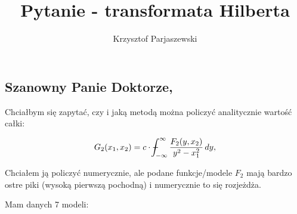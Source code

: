 \documentclass[12pt,twoside,a4paper]{article}
\title{Pytanie - transformata Hilberta}
\author{Krzysztof Parjaszewski}
\def\Xint#1{\mathchoice
{\XXint\displaystyle\textstyle{#1}}%
{\XXint\textstyle\scriptstyle{#1}}%
{\XXint\scriptstyle\scriptscriptstyle{#1}}%
{\XXint\scriptscriptstyle\scriptscriptstyle{#1}}%
\!\int}
\def\XXint#1#2#3{{\setbox0=\hbox{$#1{#2#3}{\int}$ }\vcenter{\hbox{$#2#3$ }}\kern-.6\wd0}}
\def\dashint{\Xint-}
\begin{document}
\maketitle

\section*{}

\subsection*{Szanowny Panie Doktorze,}

Chciałbym się zapytać, czy i jaką metodą można policzyć analitycznie wartość całki:

\begin{equation} \label{eq:hilbert_transform_2d_2d}
	G_2(x_1, x_2) = c \cdot \dashint_{ - \infty }^{\infty } \frac{F_2(y, x_2)} {y^2 - x_1^2} \, dy ,
\end{equation}

Chciałem ją policzyć numerycznie, ale podane funkcje/modele $F_2$ mają bardzo ostre piki (wysoką pierwszą pochodną) i numerycznie
to się rozjeżdża.

Mam danych 7 modeli:
\end{document}
